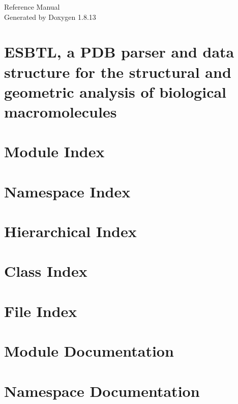 \documentclass[twoside]{book}
\newcommand{\+}{\discretionary{\mbox{\scriptsize$\hookleftarrow$}}{}{}}
\newcommand{\clearemptydoublepage}{%
  \newpage{\pagestyle{empty}\cleardoublepage}%
}
\begin{document}
\hypersetup{pageanchor=false,
             bookmarksnumbered=true,
             pdfencoding=unicode
            }
\begin{titlepage}
\vspace*{7cm}
\begin{center}%
{\Large Reference Manual}\\
\vspace*{1cm}
{\large Generated by Doxygen 1.8.13}\\
\end{center}
\end{titlepage}
\clearemptydoublepage
{}
\tableofcontents
\clearemptydoublepage
{}
\hypersetup{pageanchor=true}

\chapter{E\+S\+B\+TL, a P\+DB parser and data structure for the structural and geometric analysis of biological macromolecules}
\label{index}\hypertarget{index}{}
\chapter{Module Index}

\chapter{Namespace Index}

\chapter{Hierarchical Index}

\chapter{Class Index}

\chapter{File Index}

\chapter{Module Documentation}






\chapter{Namespace Documentation}



\end{document}
